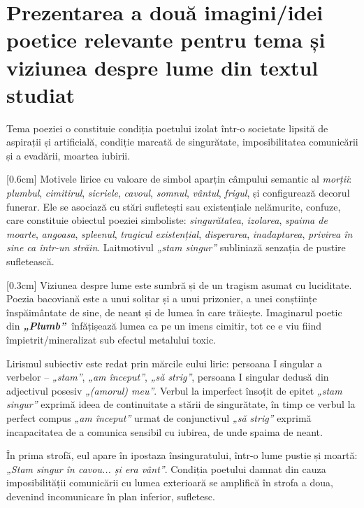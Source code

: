 \documentclass[
12pt,                        %
a4paper                      %
]{article}
\newcommand{\operatitle}{\textbf{\textit{„Plumb”\ }}} %
\begin{document}
\section{Prezentarea a două imagini/idei poetice relevante pentru te\-ma și viziunea despre lume din textul studiat}

Tema poeziei o constituie condiția poetului izolat într-o societate lipsită de aspirații și artificială, condiție marcată de singurătate, imposibilitatea comunicării și a evadării, moartea iubirii.

[0.6cm]
Motivele lirice cu valoare de simbol aparțin câmpului semantic al \textit{morții}: \textit{plumbul}, \textit{cimitirul}, \textit{sicriele}, \textit{cavoul}, \textit{somnul}, \textit{vântul}, \textit{frigul}, și configurează decorul funerar. Ele se asociază cu stări sufletești sau existențiale nelămurite, confuze, care constituie obiectul poeziei simboliste: \textit{singurătatea}, \textit{izolarea}, \textit{spaima de moarte}, \textit{angoasa}, \textit{spleenul}, \textit{tragicul existențial}, \textit{disperarea}, \textit{inadaptarea}, \textit{privirea în sine ca într-un străin}. Laitmotivul \textit{„stam singur”} subliniază senzația de pustire sufletească.

[0.3cm]
Viziunea despre lume este sumbră și de un tragism asumat cu luciditate. Poezia bacoviană este a unui solitar și a unui prizonier, a unei conștiințe înspăimântate de sine, de neant și de lumea în care trăiește. Imaginarul poetic din \operatitle înfățișează lumea ca pe un imens cimitir, tot ce e viu fiind împietrit/mineralizat sub efectul metalului toxic.

Lirismul subiectiv este redat prin mărcile eului liric: persoana I singular a verbelor -- \textit{„stam”}, \textit{„am început”}, \textit{„să strig”}, persoana I singular dedusă din adjectivul posesiv \textit{„(amorul) meu”}. Verbul la imperfect însoțit de epitet \textit{„stam singur”} exprimă ideea de continuitate a stării de singurătate, în timp ce verbul la perfect compus \textit{„am început”} urmat de conjunctivul \textit{„să strig”} exprimă incapacitatea de a comunica sensibil cu iubirea, de unde spaima de neant.

În prima strofă, eul apare în ipostaza însinguratului, într-o lume pustie și moartă: \textit{„Stam singur în cavou... și era vânt”}. Condiția poetului damnat din cauza im\-po\-si\-bi\-li\-tă\-ții comunicării cu lumea exterioară se amplifică în strofa a doua, devenind incomunicare în plan inferior, sufletesc.
\end{document}
